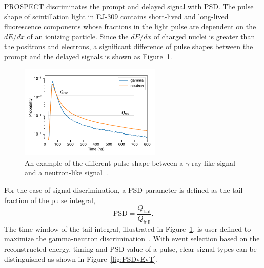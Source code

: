 	PROSPECT discriminates the prompt and delayed signal with PSD. 
	The pulse shape of scintillation light in EJ-309 contains short-lived and long-lived fluorescence components whose fractions in the light pulse are dependent on the $dE/dx$ of an ionizing particle. 
	Since the $dE/dx$ of charged nuclei is greater than the positrons and electrons, a significant difference of pulse shapes between the prompt and the delayed signals is shown as Figure~\ref{fig:PSD}.
	\begin{figure}[h]
    \centering
    \includegraphics[width=0.6\textwidth]{Figures/PSD.pdf}
    \caption[Pulse shape difference]{
	An example of the different pulse shape between a $\gamma$ ray-like signal and a neutron-like signal~\cite{bib:P50}.
	}
    \label{fig:PSD}
	\end{figure}
	For the ease of signal discrimination, a PSD parameter is defined as the tail fraction of the pulse integral, 
	\begin{equation}
       	\textrm{PSD} = \frac{Q_\textrm{tail}}{Q_\textrm{full}}.
    \end{equation}
    The time window of the tail integral, illustrated in Figure~\ref{fig:PSD}, is user defined to maximize the gamma-neutron discrimination~\cite{bib:P20}. 
    With event selection based on the reconstructed energy, timing and PSD value of a pulse, clear signal types can be distinguished as shown in Figure~\ref{fig:PSDvEvT}.
